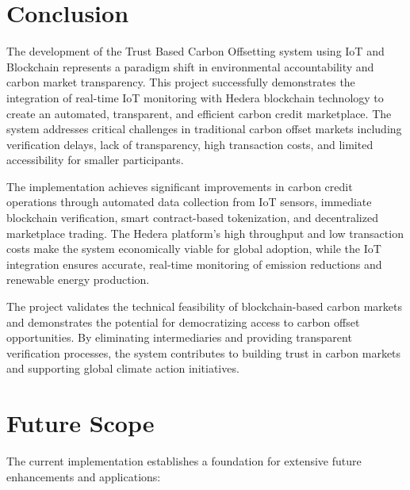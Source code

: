 \documentclass[oneside,a4paper,12pt]{book}
\begin{document}
\section{Conclusion} 

The development of the Trust Based Carbon Offsetting system using IoT and Blockchain represents a paradigm shift in environmental accountability and carbon market transparency. This project successfully demonstrates the integration of real-time IoT monitoring with Hedera blockchain technology to create an automated, transparent, and efficient carbon credit marketplace. The system addresses critical challenges in traditional carbon offset markets including verification delays, lack of transparency, high transaction costs, and limited accessibility for smaller participants.

The implementation achieves significant improvements in carbon credit operations through automated data collection from IoT sensors, immediate blockchain verification, smart contract-based tokenization, and decentralized marketplace trading. The Hedera platform's high throughput and low transaction costs make the system economically viable for global adoption, while the IoT integration ensures accurate, real-time monitoring of emission reductions and renewable energy production.

The project validates the technical feasibility of blockchain-based carbon markets and demonstrates the potential for democratizing access to carbon offset opportunities. By eliminating intermediaries and providing transparent verification processes, the system contributes to building trust in carbon markets and supporting global climate action initiatives.

\section{Future Scope}

The current implementation establishes a foundation for extensive future enhancements and applications:
\end{document}
